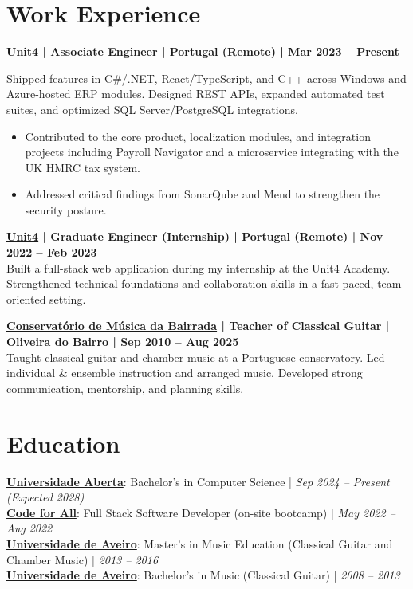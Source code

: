 \documentclass[a4paper,10pt]{article}
\begin{document}
\section{Work Experience}
\begin{tcolorbox}
\textbf{\href{https://www.unit4.com/}{Unit4} | Associate Engineer | Portugal (Remote) | Mar 2023 -- Present}\\
{\small
Shipped features in C\#/.NET, React/TypeScript, and C++ across Windows and Azure-hosted ERP modules. Designed REST APIs, expanded automated test suites, and optimized SQL Server/PostgreSQL integrations.
\begin{itemize}[leftmargin=*, itemsep=1.5pt]
  \item Contributed to the core product, localization modules, and integration projects including Payroll Navigator and a microservice integrating with the UK HMRC tax system.
  \item Addressed critical findings from SonarQube and Mend to strengthen the security posture.
\end{itemize}
}
\vspace{4pt}

\textbf{\href{https://www.unit4.com/}{Unit4} | Graduate Engineer (Internship) | Portugal (Remote) | Nov 2022 -- Feb 2023}\\
{\small
Built a full-stack web application during my internship at the Unit4 Academy. Strengthened technical foundations and collaboration skills in a fast-paced, team-oriented setting.
}
\end{tcolorbox}

\textbf{\href{https://escolartes.com}{Conservatório de Música da Bairrada} | Teacher of Classical Guitar | Oliveira do Bairro | Sep 2010 -- Aug 2025}\\
{\small
Taught classical guitar and chamber music at a Portuguese conservatory. Led individual \& ensemble instruction and arranged music. Developed strong communication, mentorship, and planning skills.
}


\section{Education}
\vspace{2pt}
{\small
\textbf{\href{https://guiadoscursos.uab.pt/en/cursos/licenciatura-em-engenharia-informatica/}{Universidade Aberta}}: Bachelor’s in Computer Science | \textit{Sep 2024 -- Present (Expected 2028)}\\[2pt]
\textbf{\href{https://codeforall.com/}{Code for All}}: Full Stack Software Developer (on-site bootcamp) | \textit{May 2022 -- Aug 2022}\\[2pt]
\textbf{\href{https://www.ua.pt/en/curso/184/}{Universidade de Aveiro}}: Master's in Music Education (Classical Guitar and Chamber Music) | \textit{2013 -- 2016}\\[2pt]
\textbf{\href{https://www.ua.pt/en/curso/40/}{Universidade de Aveiro}}: Bachelor’s in Music (Classical Guitar) | \textit{2008 -- 2013}
}
\end{document}
